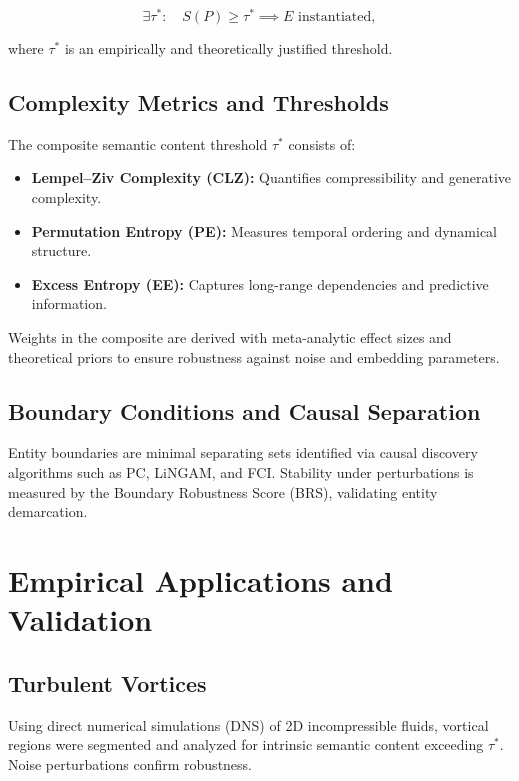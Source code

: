 \documentclass[12pt,a4paper]{article}
\begin{document}
\begin{equation}\label{eq:iia}
\exists \tau^{*}:\quad S(P) \geq \tau^{*} \implies E \text{ instantiated},
\end{equation}

where $\tau^{*}$ is an empirically and theoretically justified threshold.

\subsection{Complexity Metrics and Thresholds}

The composite semantic content threshold $\tau^{*}$ consists of:

\begin{itemize}
\item \textbf{Lempel–Ziv Complexity (CLZ):} Quantifies compressibility and generative complexity.
\item \textbf{Permutation Entropy (PE):} Measures temporal ordering and dynamical structure.
\item \textbf{Excess Entropy (EE):} Captures long-range dependencies and predictive information.
\end{itemize}

Weights in the composite are derived with meta-analytic effect sizes and theoretical priors to ensure robustness against noise and embedding parameters.

\subsection{Boundary Conditions and Causal Separation}

Entity boundaries are minimal separating sets identified via causal discovery algorithms such as PC, LiNGAM, and FCI. Stability under perturbations is measured by the Boundary Robustness Score (BRS), validating entity demarcation.

\section{Empirical Applications and Validation}

\subsection{Turbulent Vortices}

Using direct numerical simulations (DNS) of 2D incompressible fluids, vortical regions were segmented and analyzed for intrinsic semantic content exceeding $\tau^{*}$. Noise perturbations confirm robustness.
\end{document}
